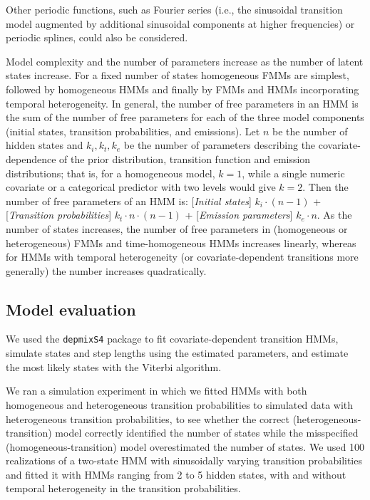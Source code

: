 \documentclass{bmcart}
\begin{document}
Other periodic functions, such as Fourier series (i.e., the sinusoidal transition model augmented 
by additional sinusoidal components at higher frequencies) or periodic splines, could also be 
considered.

Model complexity and the number of parameters increase as the number of latent states increase.
For a fixed number of states homogeneous FMMs are simplest, followed by homogeneous HMMs and 
finally by FMMs and HMMs incorporating temporal heterogeneity. In general, the number of free 
parameters in an HMM is the sum of the number of free parameters for each of the three model 
components (initial states, transition probabilities, and emissions). Let $n$ be the number of 
hidden states and $k_{i}, k_{t}, k_{e}$ be the number of parameters describing the 
covariate-dependence of the prior distribution, transition function and emission distributions; 
that is, for a homogeneous model, $k=1$, while a single numeric covariate or a categorical 
predictor with two levels would give $k=2$. Then the number of free parameters of an HMM is:
[\emph{Initial states}] $k_{i}\cdot (n-1)$ 
+ [\emph{Transition probabilities}] $k_{t}\cdot n\cdot (n-1)$ 
+ [\emph{Emission parameters}] $k_{e}\cdot n$.
As the number of states increases, the number of free parameters in (homogeneous or heterogeneous) 
FMMs and time-homogeneous HMMs increases linearly, whereas for HMMs with temporal heterogeneity 
(or covariate-dependent transitions more generally) the number increases quadratically.

\subsection*{Model evaluation}

We used the {\tt depmixS4} package \cite{visser2010depmixs4}
to fit covariate-dependent transition HMMs, 
simulate states and step lengths using the
estimated parameters, and estimate the most likely
states with the Viterbi
algorithm.

We ran a simulation experiment in which we fitted HMMs with
both homogeneous and heterogeneous 
transition probabilities to simulated data with
heterogeneous transition probabilities, to see whether
the correct (heterogeneous-transition) model correctly
identified the number of states while the misspecified
(homogeneous-transition) model overestimated the number of states.
We used 100 realizations of a two-state HMM with sinusoidally varying
transition probabilities and fitted it with HMMs ranging from
2 to 5 hidden states, with and
without temporal heterogeneity in the transition probabilities.
\end{document}
